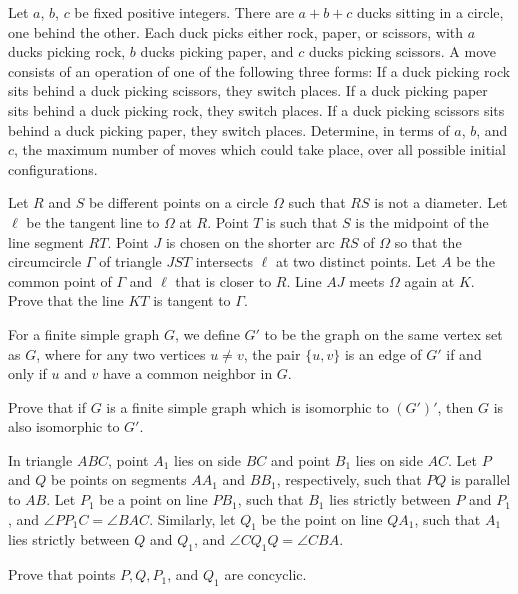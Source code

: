 \documentclass[11pt]{scrartcl}
\begin{document}
\begin{problem}[1634257707699822785]
Let $a$, $b$, $c$ be fixed positive integers. There are $a+b+c$ ducks sitting in a
circle, one behind the other. Each duck picks either rock, paper, or scissors, with $a$ ducks
picking rock, $b$ ducks picking paper, and $c$ ducks picking scissors.
A move consists of an operation of one of the following three forms:
If a duck picking rock sits behind a duck picking scissors, they switch places.
If a duck picking paper sits behind a duck picking rock, they switch places.
If a duck picking scissors sits behind a duck picking paper, they switch places.
Determine, in terms of $a$, $b$, and $c$, the maximum number of moves which could take
place, over all possible initial configurations.
\end{problem}
\begin{problem}[6269154814902278202]
	Let $R$ and $S$ be different points on a circle $\Omega$ such that $RS$ is not a diameter. Let $\ell$ be the tangent line to $\Omega$ at $R$. Point $T$ is such that $S$ is the midpoint of the line segment $RT$. Point $J$ is chosen on the shorter arc $RS$ of $\Omega$ so that the circumcircle $\Gamma$ of triangle $JST$ intersects $\ell$ at two distinct points. Let $A$ be the common point of $\Gamma$ and $\ell$ that is closer to $R$. Line $AJ$ meets $\Omega$ again at $K$. Prove that the line $KT$ is tangent to $\Gamma$.
\end{problem}
\begin{problem}[8489819892706651399]
For a finite simple graph $G$, we define $G'$ to be the graph on the same vertex set as $G$, where for any two vertices $u \neq v$, the pair $\{u,v\}$ is an edge of $G'$ if and only if $u$ and $v$ have a common neighbor in $G$.

Prove that if $G$ is a finite simple graph which is isomorphic to $(G')'$, then $G$ is also isomorphic to $G'$.
\end{problem}
\begin{problem}[684771433215596]
In triangle $ABC$, point $A_1$ lies on side $BC$ and point $B_1$ lies on side $AC$. Let $P$ and $Q$ be points on segments $AA_1$ and $BB_1$, respectively, such that $PQ$ is parallel to $AB$. Let $P_1$ be a point on line $PB_1$, such that $B_1$ lies strictly between $P$ and $P_1$, and $\angle PP_1C=\angle BAC$. Similarly, let $Q_1$ be the point on line $QA_1$, such that $A_1$ lies strictly between $Q$ and $Q_1$, and $\angle CQ_1Q=\angle CBA$.

Prove that points $P,Q,P_1$, and $Q_1$ are concyclic.
\end{problem}
\end{document}
